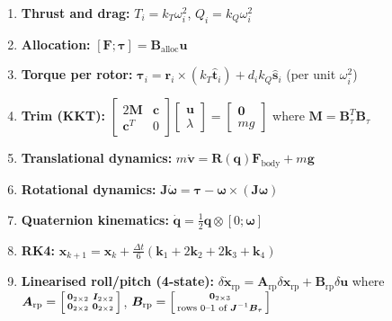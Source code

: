 \documentclass[12pt, a4paper]{article}
\newcommand{\bx}{\bm{x}}
\newcommand{\bu}{\bm{u}}
\newcommand{\bq}{\bm{q}}
\newcommand{\bomega}{\bm{\omega}}
\newcommand{\btau}{\bm{\tau}}
\newcommand{\bF}{\bm{F}}
\newcommand{\bJ}{\bm{J}}
\newcommand{\bA}{\bm{A}}
\newcommand{\bB}{\bm{B}}
\newcommand{\bI}{\bm{I}}
\newcommand{\bzero}{\bm{0}}
\begin{document}
\begin{enumerate}
    \item \textbf{Thrust and drag:} $T_i = k_T \omega_i^2$, \; $Q_i = k_Q \omega_i^2$

    \item \textbf{Allocation:} $[\bF; \btau] = \bB_{\text{alloc}} \bu$

    \item \textbf{Torque per rotor:} $\btau_i = \bm{r}_i \times (k_T \hat{\bm{t}}_i) + d_i k_Q \hat{\bm{s}}_i$ \; (per unit $\omega_i^2$)

    \item \textbf{Trim (KKT):}
    $\begin{bmatrix} 2\bm{M} & \bm{c} \\ \bm{c}^T & 0 \end{bmatrix}
    \begin{bmatrix} \bu \\ \lambda \end{bmatrix}
    = \begin{bmatrix} \bm{0} \\ mg \end{bmatrix}$
    where $\bm{M} = \bB_\tau^T \bB_\tau$

    \item \textbf{Translational dynamics:} $m\dot{\bm{v}} = \bm{R}(\bq) \bF_{\text{body}} + m\bm{g}$

    \item \textbf{Rotational dynamics:} $\bJ\dot{\bomega} = \btau - \bomega \times (\bJ\bomega)$

    \item \textbf{Quaternion kinematics:} $\dot{\bq} = \frac{1}{2}\bq \otimes [0; \bomega]$

    \item \textbf{RK4:} $\bx_{k+1} = \bx_k + \frac{\Delta t}{6}(\bm{k}_1 + 2\bm{k}_2 + 2\bm{k}_3 + \bm{k}_4)$

    \item \textbf{Linearised roll/pitch (4-state):} $\delta\dot{\bx}_{\text{rp}} = \bA_{\text{rp}}\delta\bx_{\text{rp}} + \bB_{\text{rp}}\delta\bu$ where $\bA_{\text{rp}} = \begin{bsmallmatrix} \bzero_{2 \times 2} & \bI_{2 \times 2} \\ \bzero_{2 \times 2} & \bzero_{2 \times 2} \end{bsmallmatrix}$, $\bB_{\text{rp}} = \begin{bsmallmatrix} \bzero_{2 \times 3} \\ \text{rows 0--1 of } \bJ^{-1}\bB_\tau \end{bsmallmatrix}$


\end{enumerate}
\end{document}
